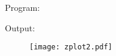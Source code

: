 \documentclass[a4paper,11pt,openright]{report}
\begin{document}
\begin{enumerate}
\vspace{2cm}

Program:


\vspace{1cm}

Output:


\begin{figure}[ht!]
\texttt{[image: zplot2.pdf]}
\centering
\end{figure}

\end{enumerate}
\end{document}
